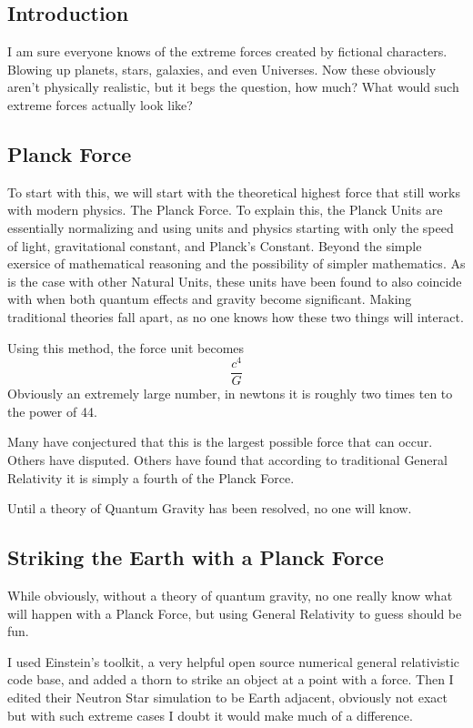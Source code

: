 \subsection{Introduction}

I am sure everyone knows of the extreme forces created by fictional characters. Blowing up planets, stars, galaxies, and even Universes. Now these obviously aren't physically realistic, but it begs the question, how much? What would such extreme forces actually look like?

\subsection{Planck Force}

To start with this, we will start with the theoretical highest force that still works with modern physics. The Planck Force. To explain this, the Planck Units are essentially normalizing and using units and physics starting with only the speed of light, gravitational constant, and Planck's Constant. Beyond the simple exersice of mathematical reasoning and the possibility of simpler mathematics. As is the case with other Natural Units, these units have been found to also coincide with when both quantum effects and gravity become significant. Making traditional theories fall apart, as no one knows how these two things will interact.

Using this method, the force unit becomes
\[
\frac{c^4}{G}
  \]
  Obviously an extremely large number, in newtons it is roughly two times ten to the power of 44.

  Many have conjectured that this is the largest possible force that can occur. Others have disputed. Others have found that according to traditional General Relativity it is simply a fourth of the Planck Force.

  Until a theory of Quantum Gravity has been resolved, no one will know.

\subsection{Striking the Earth with a Planck Force}

While obviously, without a theory of quantum gravity, no one really know what will happen with a Planck Force, but using General Relativity to guess should be fun.

I used Einstein's toolkit, a very helpful open source numerical general relativistic code base, and added a thorn to strike an object at a point with a force. Then I edited their Neutron Star simulation to be Earth adjacent, obviously not exact but with such extreme cases I doubt it would make much of a difference.

